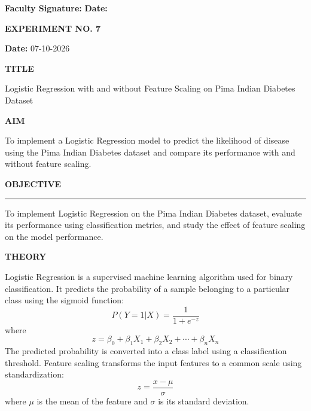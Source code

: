 \documentclass[11pt,twoside]{article}
\newcommand{\expheading}[1]{{\fontsize{14}{17}\selectfont\textbf{#1}\par}}
\newcommand{\fullrule}{\noindent\rule{\textwidth}{0.6pt}\par}
\newcommand{\tooddpage}{\clearpage\ifodd\value{page}\else\null\thispagestyle{empty}\newpage\fi}
\begin{document}
\vspace{12pt}

\noindent\textbf{Faculty Signature:} \underline{\hspace{3.6cm}} \hfill \textbf{Date:} \underline{\hspace{2.8cm}}\par

\tooddpage

{\setlength{\parskip}{1pt}\setlength{\abovedisplayskip}{2pt}\setlength{\belowdisplayskip}{2pt}
\begin{center}
\expheading{EXPERIMENT NO. 7}
\end{center}
\vspace{2pt}

\noindent\textbf{Date:} 07-10-2026\par
\vspace{6pt}

\expheading{TITLE}
\vspace{4pt}
\noindent Logistic Regression with and without Feature Scaling on Pima Indian Diabetes Dataset\par
\vspace{4pt}

\expheading{AIM}
\vspace{4pt}
\noindent To implement a Logistic Regression model to predict the likelihood of disease using the Pima Indian Diabetes dataset and compare its performance with and without feature scaling. \par
\vspace{4pt}

\expheading{OBJECTIVE}
\vspace{2pt}
\fullrule
\vspace{4pt}
\noindent To implement Logistic Regression on the Pima Indian Diabetes dataset, evaluate its performance using classification metrics, and study the effect of feature scaling on the model performance. \par
\vspace{4pt}

\expheading{THEORY}
\vspace{4pt}
Logistic Regression is a supervised machine learning algorithm used for binary classification. It predicts the probability of a sample belonging to a particular class using the sigmoid function:
\[P(Y=1|X)=\frac{1}{1+e^{-z}}\]
where
\[z=\beta_0+\beta_1X_1+\beta_2X_2+\cdots+\beta_nX_n\]
The predicted probability is converted into a class label using a classification threshold. Feature scaling transforms the input features to a common scale using standardization:
\[z=\frac{x-\mu}{\sigma}\]
where $\mu$ is the mean of the feature and $\sigma$ is its standard deviation.
\vspace{4pt}

}
\end{document}
